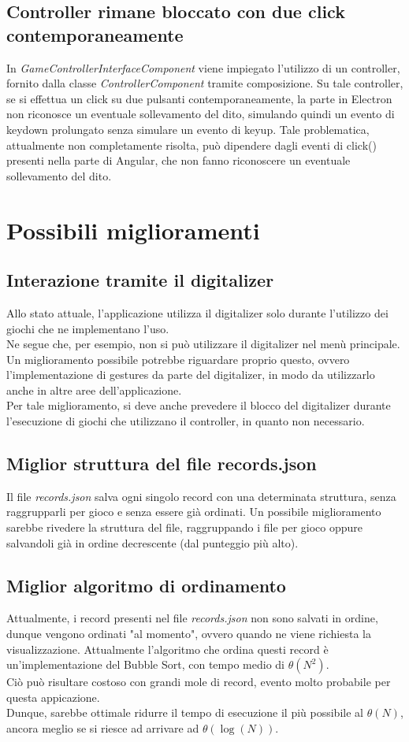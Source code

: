 \subsection{Controller rimane bloccato con due click contemporaneamente}
In \textit{GameControllerInterfaceComponent} viene impiegato l'utilizzo di un controller, fornito dalla classe \textit{ControllerComponent} tramite composizione. Su tale controller, se si effettua un click su due pulsanti contemporaneamente, la parte in Electron non riconosce un eventuale sollevamento del dito, simulando quindi un evento di keydown prolungato senza simulare un evento di keyup. Tale problematica, attualmente non completamente risolta, può dipendere dagli eventi di click() presenti nella parte di Angular, che non fanno riconoscere un eventuale sollevamento del dito.
\newpage
\section{Possibili miglioramenti}
\subsection{Interazione tramite il digitalizer}
Allo stato attuale, l'applicazione utilizza il digitalizer solo durante l'utilizzo dei giochi che ne implementano l'uso.\\ Ne segue che, per esempio, non si può utilizzare il digitalizer nel menù principale.\\
Un miglioramento possibile potrebbe riguardare proprio questo, ovvero l'implementazione di gestures da parte del digitalizer, in modo da utilizzarlo anche in altre aree dell'applicazione.\\
Per tale miglioramento, si deve anche prevedere il blocco del digitalizer durante l'esecuzione di giochi che utilizzano il controller, in quanto non necessario.
\subsection{Miglior struttura del file records.json}
Il file \textit{records.json} salva ogni singolo record con una determinata struttura, senza raggrupparli per gioco e senza essere già ordinati. Un possibile miglioramento sarebbe rivedere la struttura del file, raggruppando i file per gioco oppure salvandoli già in ordine decrescente (dal punteggio più alto).
\subsection{Miglior algoritmo di ordinamento}
Attualmente, i record presenti nel file \textit{records.json} non sono salvati in ordine, dunque vengono ordinati "al momento", ovvero quando ne viene richiesta la visualizzazione. Attualmente l'algoritmo che ordina questi record è un'implementazione del Bubble Sort, con tempo medio di $\theta(N^2)$.\\ Ciò può risultare costoso con grandi mole di record, evento molto probabile per questa appicazione.\\
Dunque, sarebbe ottimale ridurre il tempo di esecuzione il più possibile al $\theta(N)$, ancora meglio se si riesce ad arrivare ad $\theta(\log(N))$.
